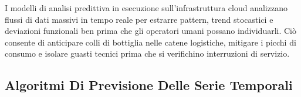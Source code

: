 \documentclass[11pt, a4paper]{article}
\begin{document}
I modelli di analisi predittiva in esecuzione sull'infrastruttura cloud analizzano flussi di dati massivi in tempo reale per estrarre pattern, trend stocastici e deviazioni funzionali ben prima che gli operatori umani possano individuarli. Ciò consente di anticipare colli di bottiglia nelle catene logistiche, mitigare i picchi di consumo e isolare guasti tecnici prima che si verifichino interruzioni di servizio.



\subsection{Algoritmi Di Previsione Delle Serie Temporali}
\end{document}
